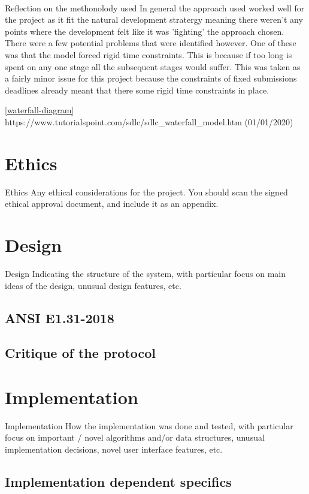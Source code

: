 \documentclass[11pt,a4paper,notitlepage]{report}
\begin{document}
	\paragraph*{}
	Reflection on the methonolody used
	In general the approach used worked well for the project as it fit the natural development stratergy meaning there weren't any points where the development felt
	like it was 'fighting' the approach chosen. There were a few potential problems that were identified however. One of these was that the model forced rigid time 
	constraints. This is because if too long is spent on any one stage all the subsequent stages would suffer. This was taken as a fairly minor issue for this project 
	because the constraints of fixed submissions deadlines already meant that there some rigid time constraints in place. 

	\ref{waterfall-diagram}
	https://www.tutorialspoint.com/sdlc/sdlc\_waterfall\_model.htm (01/01/2020)
	
	\section{Ethics}
	Ethics
	Any ethical considerations for the project. You should
	scan the signed ethical approval document, and include
	it as an appendix.
	
	\section{Design}
	Design
	Indicating the structure of the system, with particular
	focus on main ideas of the design, unusual design
	features, etc.
	\subsection{ANSI E1.31-2018}
	\subsection{Critique of the protocol}
	\section{Implementation}
	Implementation
	How the implementation was done and tested, with
	particular focus on important / novel algorithms
	and/or data structures, unusual implementation
	decisions, novel user interface features, etc.
	
	\subsection{Implementation dependent specifics}
	
\end{document}
